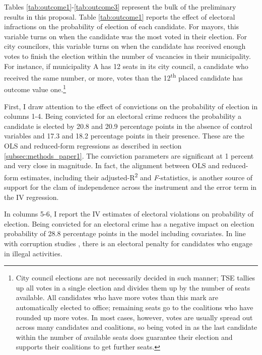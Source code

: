\documentclass[11pt]{article}
\begin{document}
Tables \ref{tab:outcome1}-\ref{tab:outcome3} represent the bulk of the preliminary results in this proposal. Table \ref{tab:outcome1} reports the effect of electoral infractions on the probability of election of each candidate. For mayors, this variable turns on when the candidate was the most voted in their election. For city councilors, this variable turns on when the candidate has received enough votes to finish the election within the number of vacancies in their municipality. For instance, if municipality A has 12 seats in its city council, a candidate who received the same number, or more, votes than the 12\textsuperscript{th} placed candidate has outcome value one.\footnote{City council elections are not necessarily decided in such manner; TSE tallies up all votes in a single election and divides them up by the number of seats available. All candidates who have more votes than this mark are automatically elected to office; remaining seats go to the coalitions who have rounded up more votes. In most cases, however, votes are usually spread out across many candidates and coalitions, so being voted in as the last candidate within the number of available seats does guarantee their election and supports their coalitions to get further seats.}



First, I draw attention to the effect of convictions on the probability of election in columns 1-4. Being convicted for an electoral crime reduces the probability a candidate is elected by 20.8 and 20.9 percentage points in the absence of control variables and 17.3 and 18.2 percentage points in their presence. These are the OLS and reduced-form regressions as described in section \ref{subsec:methods_paper1}. The conviction parameters are significant at 1 percent and very close in magnitude. In fact, the alignment between OLS and reduced-form estimates, including their adjusted-R\textsuperscript{2} and \emph{F}-statistics, is another source of support for the clam of independence across the instrument and the error term in the IV regression.

In columns 5-6, I report the IV estimates of electoral violations on probability of election. Being convicted for an electoral crime has a negative impact on election probability of 28.8 percentage points in the model including covariates. In line with corruption studies \citep{FerrazElectoralAccountabilityCorruption2011a,ChongLookingIncumbentExposing2013}, there is an electoral penalty for candidates who engage in illegal activities.
\end{document}
